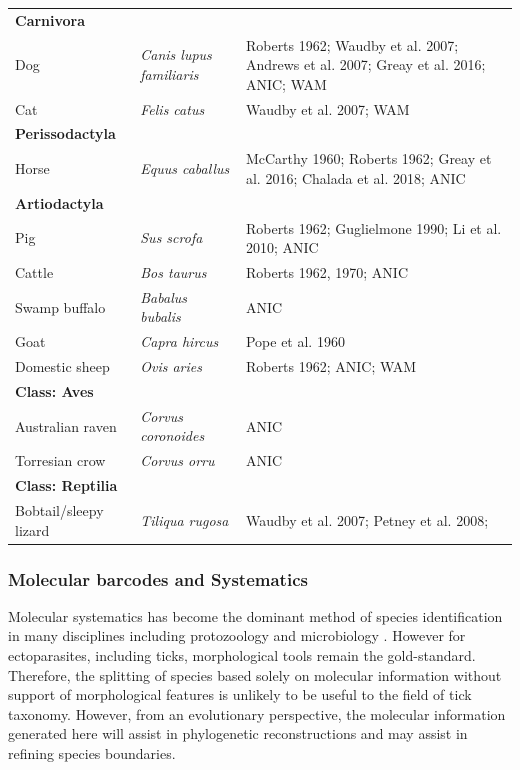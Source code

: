 \documentclass[a4paper, nobind]{templates/ociamthesis}
\begin{document}
\begin{longtable}[t]{>{\raggedright\arraybackslash}p{3cm}>{}l>{\raggedright\arraybackslash}p{6cm}}
\textbf{Carnivora} & \em{\textbf{}} & \textbf{}\\
Dog & \em{Canis lupus familiaris} & Roberts 1962; Waudby et al. 2007; Andrews et al. 2007; Greay et al. 2016; ANIC; WAM\\
Cat & \em{Felis catus} & Waudby et al. 2007; WAM\\
\textbf{Perissodactyla} & \em{\textbf{}} & \textbf{}\\
Horse & \em{Equus caballus} & McCarthy 1960; Roberts 1962; Greay et al. 2016; Chalada et al. 2018; ANIC\\
\textbf{Artiodactyla} & \em{\textbf{}} & \textbf{}\\
Pig & \em{Sus scrofa} & Roberts 1962; Guglielmone 1990; Li et al. 2010; ANIC\\
Cattle & \em{Bos taurus} & Roberts 1962, 1970; ANIC\\
Swamp buffalo & \em{Babalus bubalis} & ANIC\\
Goat & \em{Capra hircus} & Pope et al. 1960\\
Domestic sheep & \em{Ovis aries} & Roberts 1962; ANIC; WAM\\
\textbf{Class: Aves} & \em{\textbf{}} & \textbf{}\\
Australian raven & \em{Corvus coronoides} & ANIC\\
Torresian crow & \em{Corvus orru} & ANIC\\
\textbf{Class: Reptilia} & \em{\textbf{}} & \textbf{}\\
Bobtail/sleepy lizard & \em{Tiliqua rugosa} & Waudby et al. 2007; Petney et al. 2008;\\
\bottomrule
\end{longtable}
\endgroup{}

\newpage

\hypertarget{molecular-barcodes-and-systematics}{%
\subsubsection{Molecular barcodes and Systematics}\label{molecular-barcodes-and-systematics}}

Molecular systematics has become the dominant method of species identification in many disciplines including protozoology \autocite{maiaCommentsSystematicRevision2016,maslovRecentAdvancesTrypanosomatid2019} and microbiology \autocite{margosControversiesBacterialTaxonomy2019}.
However for ectoparasites, including ticks, morphological tools remain the gold-standard.
Therefore, the splitting of species based solely on molecular information without support of morphological features is unlikely to be useful to the field of tick taxonomy.
However, from an evolutionary perspective, the molecular information generated here will assist in phylogenetic reconstructions and may assist in refining species boundaries.
\end{document}

